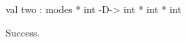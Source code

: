\chklistingtrue
{}
\begin{ChkListingMsg}
val two : modes * int -D-> int * int * int
\end{ChkListingMsg}
\begin{ChkListingErr}
Success.
\end{ChkListingErr}
